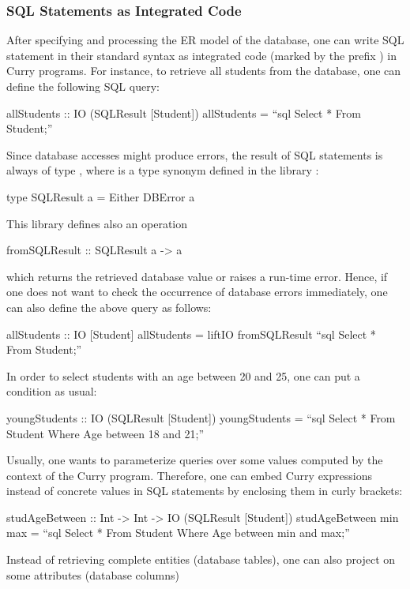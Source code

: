 \subsubsection{SQL Statements as Integrated Code}

After specifying and processing the ER model of the database,
one can write SQL statement in their standard syntax
as integrated code (marked by the prefix ) in Curry programs.
For instance, to retrieve all students from the database, one
can define the following SQL query:
%
\begin{curry}
allStudents :: IO (SQLResult [Student])
allStudents = ``sql Select * From Student;''
\end{curry}
%
Since database accesses might produce errors,
the result of SQL statements is always of type
, where  is a type synonym
defined in the \CYS library :
%
\begin{curry}
type SQLResult a = Either DBError a
\end{curry}
%
This library defines also an operation
%
\begin{curry}
fromSQLResult :: SQLResult a -> a
\end{curry}
%
which returns the retrieved database value or raises a run-time error.
Hence, if one does not want to check the occurrence of database errors
immediately, one can also define the above query as follows:
%
\begin{curry}
allStudents :: IO [Student]
allStudents = liftIO fromSQLResult ``sql Select * From Student;''
\end{curry}
%
In order to select students with an age between 20 and 25,
one can put a condition as usual:
%
\begin{curry}
youngStudents :: IO (SQLResult [Student])
youngStudents = ``sql Select * From Student
                      Where Age between 18 and 21;''
\end{curry}
%
Usually, one wants to parameterize queries over some values
computed by the context of the Curry program.
Therefore, one can embed Curry expressions instead of concrete
values in SQL statements by enclosing them in curly brackets:
%
\begin{curry}
studAgeBetween :: Int -> Int -> IO (SQLResult [Student])
studAgeBetween min max =
  ``sql Select * From Student
        Where Age between {min} and {max};''
\end{curry}
%
Instead of retrieving complete entities (database tables),
one can also project on some attributes (database columns)
